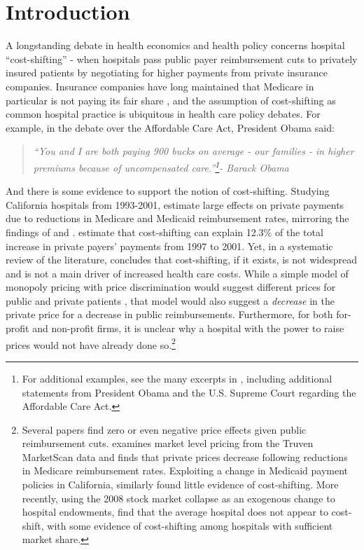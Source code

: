 \documentclass[12pt]{article}
\begin{document}
\newpage
\section{Introduction}
A longstanding debate in health economics and health policy concerns hospital ``cost-shifting'' - when hospitals pass public payer reimbursement cuts to privately insured patients by negotiating for higher payments from private insurance companies.  Insurance companies have long maintained that Medicare in particular is not paying its fair share \citep{frakt2011}, and the assumption of cost-shifting as common hospital practice is ubiquitous in health care policy debates.  For example, in the debate over the Affordable Care Act, President Obama said:
\begin{quote}
\textit{``You and I are both paying 900 bucks on average - our families - in higher premiums because of uncompensated care.''\footnote{For additional examples, see the many excerpts in \cite{dranove2017}, including additional statements from President Obama and the U.S. Supreme Court regarding the Affordable Care Act.}- Barack Obama}
\end{quote}
And there is some evidence to support the notion of cost-shifting. Studying California hospitals from 1993-2001, \cite{zwanziger2006} estimate large effects on private payments due to reductions in Medicare and Medicaid reimbursement rates, mirroring the findings of \cite{lee2003} and \cite{zwanziger2000}. \cite{zwanziger2006} estimate that cost-shifting can explain 12.3\% of the total increase in private payers' payments from 1997 to 2001.  Yet, in a systematic review of the literature, \citet{frakt2011} concludes that cost-shifting, if it exists, is not widespread and is not a main driver of increased health care costs.   While a simple model of monopoly pricing with price discrimination would suggest different prices for public and private patients \citep{hay1983}, that model would also suggest a \textit{decrease} in the private price for a decrease in public reimbursements.  Furthermore, for both for-profit and non-profit firms, it is unclear why a hospital with the power to raise prices would not have already done so.\footnote{Several papers find zero or even negative price effects given public reimbursement cuts. \cite{white2013} examines market level pricing from the Truven MarketScan data and finds that private prices decrease following reductions in Medicare reimbursement rates. Exploiting a change in Medicaid payment policies in California, \citet{dranove1998} similarly found little evidence of cost-shifting. More recently, using the 2008 stock market collapse as an exogenous change to hospital endowments, \cite{dranove2017} find that the average hospital does not appear to cost-shift, with some evidence of cost-shifting among hospitals with sufficient market share.}
\end{document}
